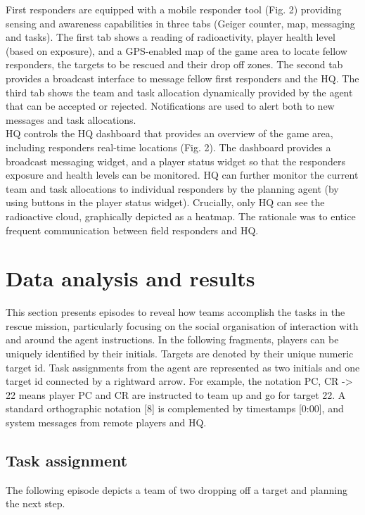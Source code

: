 First responders are equipped with a mobile responder tool (Fig. 2) providing sensing and awareness capabilities in three tabs (Geiger counter, map, messaging and tasks). The first tab shows a reading of radioactivity, player health level (based on exposure), and a GPS-enabled map of the game area to locate fellow responders, the targets to be rescued and their drop off zones. The second tab provides a broadcast interface to message fellow first responders and the HQ. The third tab shows the team and task allocation dynamically provided by the agent that can be accepted or rejected. Notifications are used to alert both to new messages and task allocations.\\

HQ controls the HQ dashboard that provides an overview of the game area, including responders real-time locations (Fig. 2). The dashboard provides a broadcast messaging widget, and a player status widget so that the responders exposure and health levels can be monitored. HQ can further monitor the current team and task allocations to individual responders by the planning agent (by using buttons in the player status widget). Crucially, only HQ can see the radioactive cloud, graphically depicted as a heatmap. The rationale was to entice frequent communication between field responders and HQ.  \\

\section{Data analysis and results}

This section presents episodes to reveal how teams accomplish the tasks in the rescue mission, particularly focusing on the social organisation of interaction with and around the agent instructions. In the following fragments, players can be uniquely identified by their initials. Targets are denoted by their unique numeric target id. Task assignments from the agent are represented as two initials and one target id connected by a rightward arrow. For example, the notation PC, CR -> 22 means player PC and CR are instructed to team up and go for target 22. A standard orthographic notation [8] is complemented by timestamps [0:00], and system messages from remote players and HQ.  

\subsection{Task assignment}
The following episode depicts a team of two dropping off a target and planning the next step.\\

